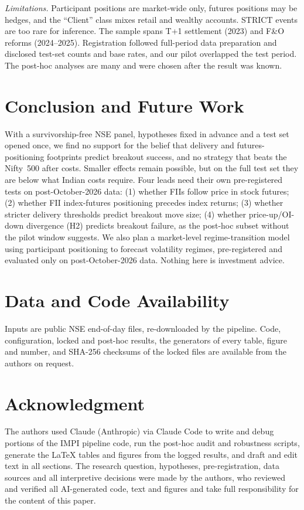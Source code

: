 \documentclass[conference]{IEEEtran}
\begin{document}
\emph{Limitations.} Participant positions are market-wide only, futures positions may be hedges, and the
``Client'' class mixes retail and wealthy accounts. STRICT events are too rare for inference. The sample spans
T+1 settlement (2023) and F\&O reforms (2024--2025). Registration followed full-period data preparation and
disclosed test-set counts and base rates, and our pilot overlapped the test period. The post-hoc analyses are
many and were chosen after the result was known.

\section{Conclusion and Future Work}
With a survivorship-free NSE panel, hypotheses fixed in advance and a test set opened once, we find no support
for the belief that delivery and futures-positioning footprints predict breakout success, and no strategy that
beats the Nifty~500 after costs. Smaller effects remain possible, but on the full test set they are below what
Indian costs require. Four leads need their own pre-registered tests on post-October-2026 data: (1) whether
FIIs follow price in stock futures; (2) whether FII index-futures positioning precedes index returns; (3)
whether stricter delivery thresholds predict breakout move size; (4) whether price-up/OI-down divergence (H2)
predicts breakout failure, as the post-hoc subset without the pilot window suggests. We also plan a
market-level regime-transition model using participant positioning to forecast volatility regimes,
pre-registered and evaluated only on post-October-2026 data. Nothing here is investment advice.

\section*{Data and Code Availability}
Inputs are public NSE end-of-day files, re-downloaded by the pipeline. Code, configuration, locked and
post-hoc results, the generators of every table, figure and number, and SHA-256 checksums of the locked files
are available from the authors on request.

\section*{Acknowledgment}
The authors used Claude (Anthropic) via Claude Code to write and debug portions of the IMPI pipeline code,
run the post-hoc audit and robustness scripts, generate the \LaTeX{} tables and figures from the logged
results, and draft and edit text in all sections. The research question, hypotheses, pre-registration, data
sources and all interpretive decisions were made by the authors, who reviewed and verified all AI-generated
code, text and figures and take full responsibility for the content of this paper.
\end{document}
